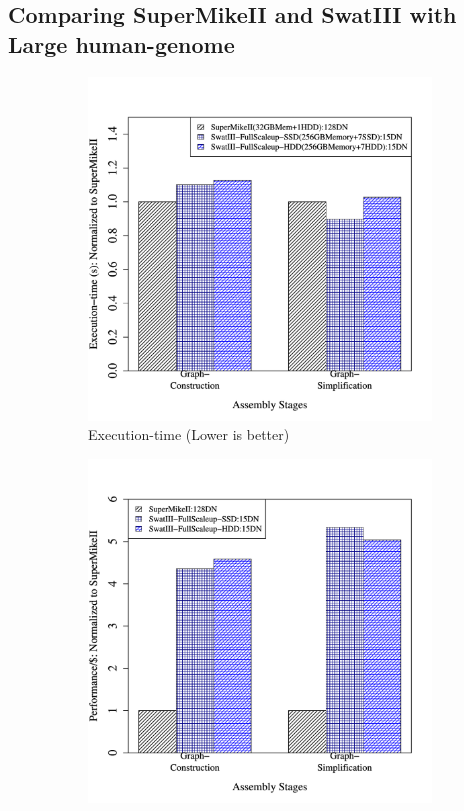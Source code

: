 \documentclass[conference]{IEEEtran}
\begin{document}
\subsection {Comparing SuperMikeII and SwatIII with Large human-genome }
\begin{figure}[htb]
        \begin{subfigure}[b]{0.23\textwidth}
                \includegraphics[width=\textwidth]{Figure/PerormanceData/Plots/PerfDiffArchHum.pdf}
                \caption{Execution-time (Lower is better)}
                \label{fig:DifferentArchitecturesPerfHum}
        \end{subfigure}
        \begin{subfigure}[b]{0.23\textwidth}
                \includegraphics[width=\textwidth]{Figure/PerormanceData/Plots/PerfPerDollarDiffArchHum.pdf}

\end{subfigure}
\end{figure}
\end{document}
